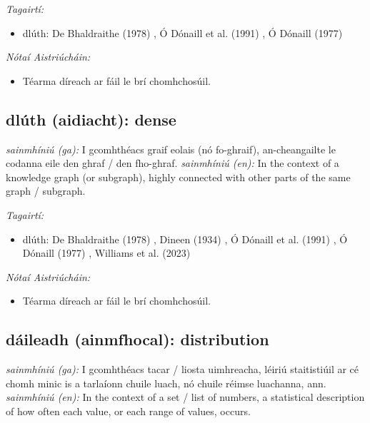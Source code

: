 \documentclass{article}
\begin{document}
 \noindent \textit{Tagairtí:}
\begin{itemize}
	\item dlúth: De Bhaldraithe (1978) \cite{de-bhaldraithe}, Ó Dónaill et al. (1991) \cite{focloir-beag}, Ó Dónaill (1977) \cite{odonaill}
\end{itemize}

 \noindent \textit{Nótaí Aistriúcháin:}
\begin{itemize}
	\item Téarma díreach ar fáil le brí chomhchosúil.
\end{itemize}


\subsection*{dlúth (aidiacht): dense} 
 \noindent \textit{sainmhíniú (ga):} I gcomhthéacs graif eolais (nó fo-ghraif), an-cheangailte le codanna eile den ghraf / den fho-ghraf.
\newline\newline
 \noindent \textit{sainmhíniú (en):} In the context of a knowledge graph (or subgraph), highly connected with other parts of the same graph / subgraph.
\newline

 \noindent \textit{Tagairtí:}
\begin{itemize}
	\item dlúth: De Bhaldraithe (1978) \cite{de-bhaldraithe}, Dineen (1934) \cite{dineen}, Ó Dónaill et al. (1991) \cite{focloir-beag}, Ó Dónaill (1977) \cite{odonaill}, Williams et al. (2023) \cite{storchiste}
\end{itemize}

 \noindent \textit{Nótaí Aistriúcháin:}
\begin{itemize}
	\item Téarma díreach ar fáil le brí chomhchosúil.
\end{itemize}


\subsection*{dáileadh (ainmfhocal): distribution} 
 \noindent \textit{sainmhíniú (ga):} I gcomhthéacs tacar / liosta uimhreacha, léiriú staitistiúil ar cé chomh minic is a tarlaíonn chuile luach, nó chuile réimse luachanna, ann.
\newline\newline
 \noindent \textit{sainmhíniú (en):} In the context of a set / list of numbers, a statistical description of how often each value, or each range of values, occurs.
\newline
\end{document}
